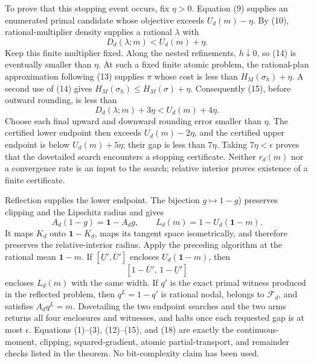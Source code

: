 To prove that this stopping event occurs, fix \(\eta>0\).  Equation (9)
supplies an enumerated primal candidate whose objective exceeds
\(U_d(m)-\eta\).  By (10), rational-multiplier density supplies a rational
\(\lambda\) with
\[
 D_d(\lambda;m)<U_d(m)+\eta.                                \tag{16}
\]
Keep this finite multiplier fixed.  Along the nested refinements,
\(h\downarrow0\), so (14) is eventually smaller than \(\eta\).  At such a
fixed finite atomic problem, the rational-plan approximation following (13)
supplies \(\pi\) whose cost is less than \(H_M(\sigma_h)+\eta\).  A second use
of (14) gives \(H_M(\sigma_h)\leq H_M(\sigma)+\eta\).  Consequently (15),
before outward rounding, is less than
\[
 D_d(\lambda;m)+3\eta<U_d(m)+4\eta.                         \tag{17}
\]
Choose each final upward and downward rounding error smaller than \(\eta\).
The certified lower endpoint then exceeds \(U_d(m)-2\eta\), and the certified
upper endpoint is below \(U_d(m)+5\eta\); their gap is less than \(7\eta\).
Taking \(7\eta<\epsilon\) proves that the dovetailed search encounters a
stopping certificate.  Neither \(r_d(m)\) nor a convergence rate is an input
to the search; relative interior proves existence of a finite certificate.

Reflection supplies the lower endpoint.  The bijection \(g\mapsto1-g\))
preserves clipping and the Lipschitz radius and gives
\[
 A_d(1-g)=\mathbf1-A_dg,
 \qquad
 L_d(m)=1-U_d(\mathbf1-m).                                  \tag{18}
\]
It maps \(K_d\) onto \(\mathbf1-K_d\), maps its tangent space isometrically,
and therefore preserves the relative-interior radius.  Apply the preceding
algorithm at the rational mean \(\mathbf1-m\).  If
\([\underline U',\overline U']\) encloses
\(U_d(\mathbf1-m)\), then
\[
 [1-\overline U',\,1-\underline U']                         \tag{19}
\]
encloses \(L_d(m)\) with the same width.  If \(q'\) is the exact primal
witness produced in the reflected problem, then \(q^L=1-q'\) is rational
nodal, belongs to \(\mathcal F_d\), and satisfies \(A_dq^L=m\).  Dovetailing
the two endpoint searches and the two arms returns all four enclosures and
witnesses, and halts once each requested gap is at most \(\epsilon\).
Equations (1)--(3), (12)--(15), and (18) are exactly the continuous-moment,
clipping, squared-gradient, atomic partial-transport, and remainder checks
listed in the theorem.  No bit-complexity claim has been used.

